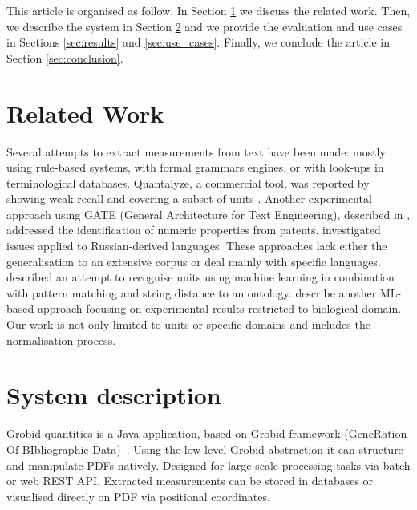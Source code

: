 \documentclass[sigconf]{acmart}
\begin{document}
This article is organised as follow. In Section \ref{sec:related_work} we discuss the related work. Then, we describe the system in Section \ref{sec:system} and we provide the evaluation and use cases in Sections \ref{sec:results} and \ref{sec:use_cases}. Finally, we conclude the article in Section \ref{sec:conclusion}.

\section{Related Work}
\label{sec:related_work}
Several attempts to extract measurements from text have been made: mostly using rule-based systems, with formal grammars engines, or with look-ups in terminological databases. Quantalyze, a commercial tool, was reported by  \cite{hundman2017measurement} showing weak recall and covering a subset of units \cite{aras2014applications}. Another experimental approach using GATE (General Architecture for Text Engineering), described in \cite{agatonovic2008large}, addressed the identification of numeric properties from patents. \cite{am2013processing} investigated issues applied to Russian-derived languages. These approaches lack either the generalisation to an extensive corpus or deal mainly with specific languages. \cite{berrahou2013extract} described an attempt to recognise units using machine learning in combination with pattern matching and string distance to an ontology. \cite{kang_extracting_2013} describe another ML-based approach focusing on experimental results restricted to biological domain. Our work is not only limited to units or specific domains and includes the normalisation process. 

\section{System description}
\label{sec:system}
Grobid-quantities is a Java application, based on Grobid framework (GeneRation Of BIbliographic Data)~\cite{GROBID}. Using the low-level Grobid abstraction it can structure and manipulate PDFs natively. Designed for large-scale processing tasks via batch or web REST API. Extracted measurements can be stored in databases or visualised directly on PDF via positional coordinates.
\end{document}

